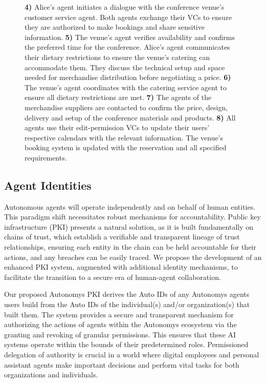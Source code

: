 \documentclass[conference]{IEEEtran}
\begin{document}
\begin{figure}
{\textbf{4)} Alice's agent initiates a dialogue with the conference venue's customer service agent. Both agents exchange their VCs to ensure they are authorized to make bookings and share sensitive information.
\textbf{5)} The venue's agent verifies availability and confirms the preferred time for the conference. Alice's agent communicates their dietary restrictions to ensure the venue's catering can accommodate them. They discuss the technical setup and space needed for merchandise distribution before negotiating a price.
\textbf{6)} The venue’s agent coordinates with the catering service agent to ensure all dietary restrictions are met.
\textbf{7)} The agents of the merchandise suppliers are contacted to confirm the price, design, delivery and setup of the conference materials and products.
\textbf{8)} All agents use their edit-permission VCs to update their users' respective calendars with the relevant information. The venue’s booking system is updated with the reservation and all specified requirements.}
\label{fig:agentscoor}
\end{figure}

\subsection{Agent Identities}
\label{sec:agentids}
Autonomous agents will operate independently and on behalf of human entities. This paradigm shift necessitates robust mechanisms for accountability. Public key infrastructure (PKI) presents a natural solution, as it is built fundamentally on chains of trust, which establish a verifiable and transparent lineage of trust relationships, ensuring each entity in the chain can be held accountable for their actions, and any breaches can be easily traced. We propose the development of an enhanced PKI system, augmented with additional identity mechanisms, to facilitate the transition to a secure era of human-agent collaboration.

Our proposed Autonomys PKI derives the Auto IDs of any Autonomys agents users build from the Auto IDs of the individual(s) and/or organization(s) that built them. The system provides a secure and transparent mechanism for authorizing the actions of agents within the Autonomys ecosystem via the granting and revoking of granular permissions. This ensures that these AI systems operate within the bounds of their predetermined roles. Permissioned delegation of authority is crucial in a world where digital employees and personal assistant agents make important decisions and perform vital tasks for both organizations and individuals.
\end{document}
